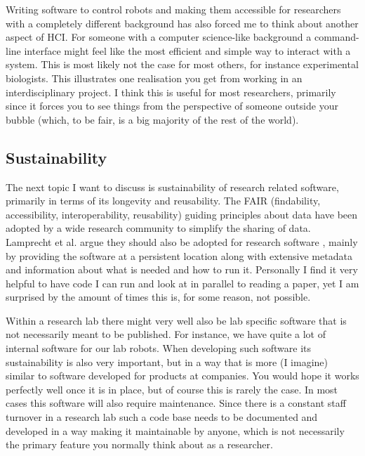 \documentclass[11pt]{article}
\begin{document}

Writing software to control robots and making them accessible for researchers with a completely different background has also forced me to think about another aspect of HCI. For someone with a computer science-like background a command-line interface might feel like the most efficient and simple way to interact with a system. This is most likely not the case for most others, for instance experimental biologists. This illustrates one realisation you get from working in an interdisciplinary project. I think this is useful for most researchers, primarily since it forces you to see things from the perspective of someone outside your bubble (which, to be fair, is a big majority of the rest of the world).

\subsection*{Sustainability}
The next topic I want to discuss is sustainability of research related software, primarily in terms of its longevity and reusability. The FAIR (findability, accessibility, interoperability, reusability) guiding principles about data have been adopted by a wide research community to simplify the sharing of data. Lamprecht et al. argue they should also be adopted for research software \cite{lamprecht_towards_2020}, mainly by providing the software at a persistent location along with extensive metadata and information about what is needed and how to run it. Personally I find it very helpful to have code I can run and look at in parallel to reading a paper, yet I am surprised by the amount of times this is, for some reason, not possible.

Within a research lab there might very well also be lab specific software that is not necessarily meant to be published. For instance, we have quite a lot of internal software for our lab robots. When developing such software its sustainability is also very important, but in a way that is more (I imagine) similar to software developed for products at companies. You would hope it works perfectly well once it is in place, but of course this is rarely the case. In most cases this software will also require maintenance. Since there is a constant staff turnover in a research lab such a code base needs to be documented and developed in a way making it maintainable by anyone, which is not necessarily the primary feature you normally think about as a researcher.
\end{document}
